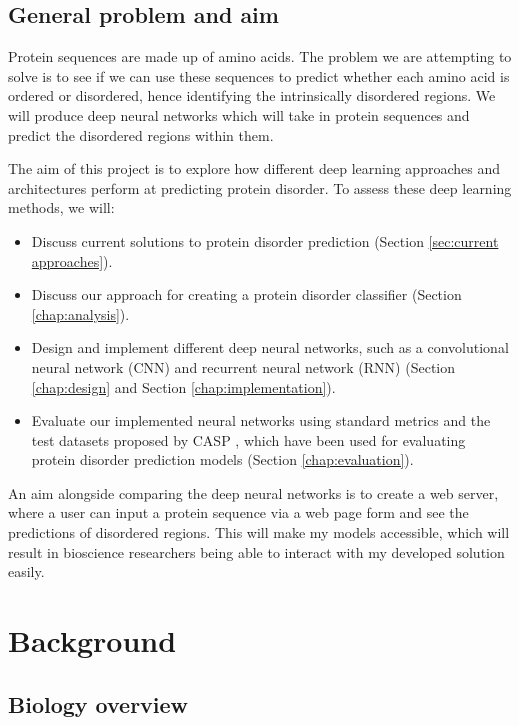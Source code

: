 \documentclass{l4proj}
\begin{document}
\section{General problem and aim}

Protein sequences are made up of amino acids. The problem we are attempting to solve is to see if we can use these sequences to predict whether each amino acid is ordered or disordered, hence identifying the intrinsically disordered regions. We will produce deep neural networks which will take in protein sequences and predict the disordered regions within them. 

The aim of this project is to explore how different deep learning approaches and architectures perform at predicting protein disorder. To assess these deep learning methods, we will: 
\begin{itemize}
    \item Discuss current solutions to protein disorder prediction (Section \ref{sec:current approaches}).
    \item Discuss our approach for creating a protein disorder classifier (Section \ref{chap:analysis}).
    \item Design and implement different deep neural networks, such as a convolutional neural network (CNN) and recurrent neural network (RNN) (Section \ref{chap:design} and Section \ref{chap:implementation}). 
    \item Evaluate our implemented neural networks using standard metrics and the test datasets proposed by CASP \citep{casp}, which have been used for evaluating protein disorder prediction models (Section \ref{chap:evaluation}). 
\end{itemize}
An aim alongside comparing the deep neural networks is to create a web server, where a user can input a protein sequence via a web page form and see the predictions of disordered regions. This will make my models accessible, which will result in bioscience researchers being able to interact with my developed solution easily.


\chapter{Background}
\label{chap:background}

\section{Biology overview}
\end{document}
